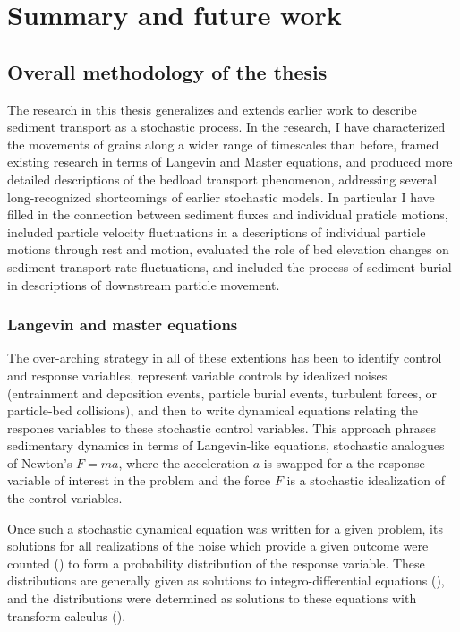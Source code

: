 
\chapter{Summary and future work}
\label{ch:conc}
\section{Overall methodology of the thesis}

The research in this thesis generalizes and extends earlier work to describe sediment transport as a stochastic process. In the research, I have characterized the movements of grains along a wider range of timescales than before, framed existing research in terms of Langevin and Master equations, and produced more detailed descriptions of the bedload transport phenomenon, addressing several long-recognized shortcomings of earlier stochastic models. In particular I have filled in the connection between sediment fluxes and individual praticle motions, included particle velocity fluctuations in a descriptions of individual particle motions through rest and motion, evaluated the role of bed elevation changes on sediment transport rate fluctuations, and included the process of sediment burial in descriptions of downstream particle movement. 

\subsection{Langevin and master equations}

The over-arching strategy in all of these extentions has been to identify control and response variables, represent variable controls by idealized noises (entrainment and deposition events, particle burial events, turbulent forces, or particle-bed collisions), and then to write dynamical equations relating the respones variables to these stochastic control variables.
This approach phrases sedimentary dynamics in terms of Langevin-like equations, stochastic analogues of Newton's $F=ma$, where the acceleration $a$ is swapped for a the response variable of interest in the problem and the force $F$ is a stochastic idealization of the control variables. 

Once such a stochastic dynamical equation was written for a given problem, its solutions for all realizations of the noise which provide a given outcome were counted () to form a probability distribution of the response variable. These distributions are generally given as solutions to integro-differential equations (), and the distributions were determined as solutions to these equations with transform calculus (). 


